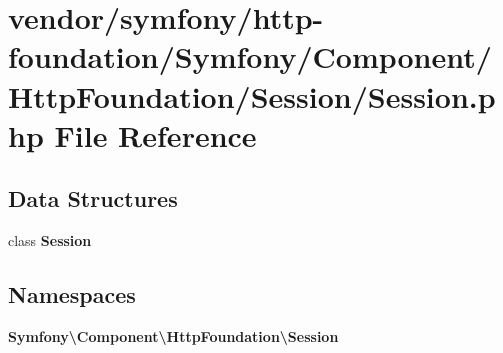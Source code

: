 \section{vendor/symfony/http-\/foundation/\+Symfony/\+Component/\+Http\+Foundation/\+Session/\+Session.php File Reference}
\label{vendor_2symfony_2http-foundation_2_symfony_2_component_2_http_foundation_2_session_2session_8php}
\subsection*{Data Structures}
\begin{DoxyCompactItemize}
\item 
class {\bf Session}
\end{DoxyCompactItemize}
\subsection*{Namespaces}
\begin{DoxyCompactItemize}
\item 
 {\bf Symfony\textbackslash{}\+Component\textbackslash{}\+Http\+Foundation\textbackslash{}\+Session}
\end{DoxyCompactItemize}
